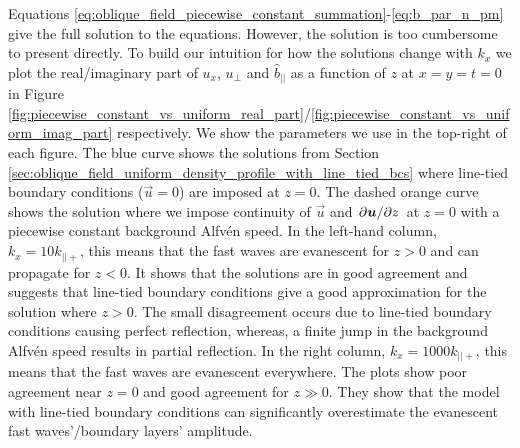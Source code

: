 Equations \eqref{eq:oblique_field_piecewise_constant_summation}-\eqref{eq:b_par_n_pm} give the full solution to the equations. However, the solution is too cumbersome to present directly.  To build our intuition for how the solutions change with $k_x$ we plot the real/imaginary part of $u_x$, $u_\perp$ and $\hat{b}_{||}$  as a function of $z$ at $x=y=t=0$ in Figure \ref{fig:piecewise_constant_vs_uniform_real_part}/\ref{fig:piecewise_constant_vs_uniform_imag_part} respectively. We show the parameters we use in the top-right of each figure. The blue curve shows the solutions from Section \ref{sec:oblique_field_uniform_density_profile_with_line_tied_bcs} where line-tied boundary conditions ($\vec{u}=0$) are imposed at $z=0$. The dashed orange curve shows the solution where we impose continuity of $\vec{u}$ and $\pdv*{\boldsymbol{u}}{z}$ at $z=0$ with a piecewise constant background Alfv\'en speed. In the left-hand column, $k_x=10k_{||+}$, this means that the fast waves are evanescent for $z>0$ and can propagate for $z<0$. It shows that the solutions are in good agreement and suggests that line-tied boundary conditions give a good approximation for the solution where $z>0$. The small disagreement occurs due to line-tied boundary conditions causing perfect reflection, whereas, a finite jump in the background Alfv\'en speed results in partial reflection. In the right column, $k_x=1000k_{||+}$, this means that the fast waves are evanescent everywhere. The plots show poor agreement near $z=0$ and good agreement for $z\gg0$. They show that the model with line-tied boundary conditions can significantly overestimate the evanescent fast waves'/boundary layers' amplitude.

